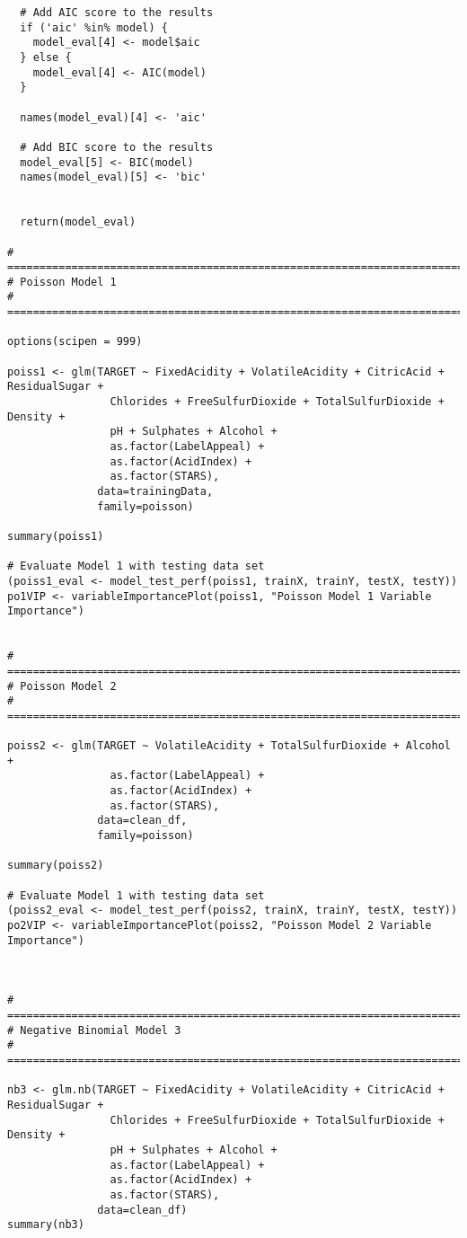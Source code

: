 \documentclass[
]{article}
\begin{document}
\begin{verbatim}
  # Add AIC score to the results
  if ('aic' %in% model) {
    model_eval[4] <- model$aic
  } else {
    model_eval[4] <- AIC(model)
  }
  
  names(model_eval)[4] <- 'aic'
 
  # Add BIC score to the results
  model_eval[5] <- BIC(model)
  names(model_eval)[5] <- 'bic'

   
  return(model_eval)

# =====================================================================================
# Poisson Model 1
# =====================================================================================

options(scipen = 999)

poiss1 <- glm(TARGET ~ FixedAcidity + VolatileAcidity + CitricAcid + ResidualSugar + 
                Chlorides + FreeSulfurDioxide + TotalSulfurDioxide + Density +
                pH + Sulphates + Alcohol + 
                as.factor(LabelAppeal) +
                as.factor(AcidIndex) +
                as.factor(STARS),
              data=trainingData, 
              family=poisson)

summary(poiss1)

# Evaluate Model 1 with testing data set
(poiss1_eval <- model_test_perf(poiss1, trainX, trainY, testX, testY))
po1VIP <- variableImportancePlot(poiss1, "Poisson Model 1 Variable Importance")


# =====================================================================================
# Poisson Model 2
# =====================================================================================

poiss2 <- glm(TARGET ~ VolatileAcidity + TotalSulfurDioxide + Alcohol + 
                as.factor(LabelAppeal) + 
                as.factor(AcidIndex) + 
                as.factor(STARS),
              data=clean_df, 
              family=poisson)

summary(poiss2)

# Evaluate Model 1 with testing data set
(poiss2_eval <- model_test_perf(poiss2, trainX, trainY, testX, testY))
po2VIP <- variableImportancePlot(poiss2, "Poisson Model 2 Variable Importance")



# =====================================================================================
# Negative Binomial Model 3
# =====================================================================================

nb3 <- glm.nb(TARGET ~ FixedAcidity + VolatileAcidity + CitricAcid + ResidualSugar + 
                Chlorides + FreeSulfurDioxide + TotalSulfurDioxide + Density +
                pH + Sulphates + Alcohol + 
                as.factor(LabelAppeal) +
                as.factor(AcidIndex) +
                as.factor(STARS),
              data=clean_df)
summary(nb3)


\end{verbatim}
\end{document}
